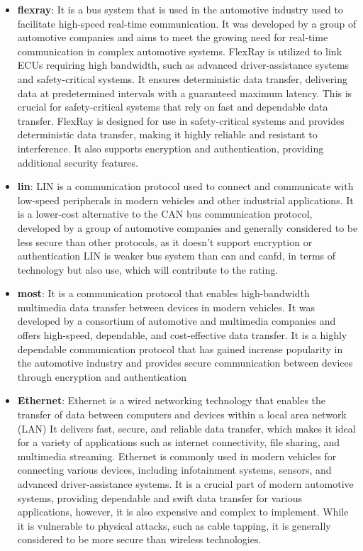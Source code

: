 \begin{itemize}
    \item \textbf{\gls{flexray}}: It is a bus system that is used in the automotive industry used to facilitate high-speed real-time communication.
    It was developed by a group of automotive companies and aims to meet the growing need for real-time communication in complex automotive systems.
    FlexRay is utilized to link ECUs requiring high bandwidth, such as advanced driver-assistance systems and safety-critical systems. 
    It ensures deterministic data transfer, delivering data at predetermined intervals with a guaranteed maximum latency. 
    This is crucial for safety-critical systems that rely on fast and dependable data transfer.
    FlexRay is designed for use in safety-critical systems and provides deterministic data transfer, making it highly reliable and resistant to interference. 
    It also supports encryption and authentication, providing additional security features.

    \item \textbf{\gls{lin}}: LIN is a communication protocol used to connect and communicate with low-speed peripherals in modern vehicles and other industrial applications. 
    It is a lower-cost alternative to the CAN bus communication protocol, developed by a group of automotive companies 
    and generally considered to be less secure than other protocols, as it doesn't support encryption or authentication
    LIN is weaker bus system than \gls{can} and \gls{canfd}, in terms of technology but also use, which will contribute to the rating.
    
    \item \textbf{\gls{most}}: It is a communication protocol that enables high-bandwidth multimedia data transfer between devices in modern vehicles. 
    It was developed by a consortium of automotive and multimedia companies and offers high-speed, dependable, and cost-effective data transfer.
    It is a highly dependable communication protocol that has gained increase popularity in the automotive industry and
    provides secure communication between devices through encryption and authentication

    \item \textbf{Ethernet}: Ethernet is a wired networking technology that enables the transfer of data between computers and devices within a local area network (LAN)
    It delivers fast, secure, and reliable data transfer, which makes it ideal for a variety of applications such as internet connectivity, file sharing, and multimedia streaming.
    Ethernet is commonly used in modern vehicles for connecting various devices, including infotainment systems, sensors, and advanced driver-assistance systems. 
    It is a crucial part of modern automotive systems, providing dependable and swift data transfer for various applications, however, it is also expensive and complex to implement.
    While it is vulnerable to physical attacks, such as cable tapping, it is generally considered to be more secure than wireless technologies.


\end{itemize}

